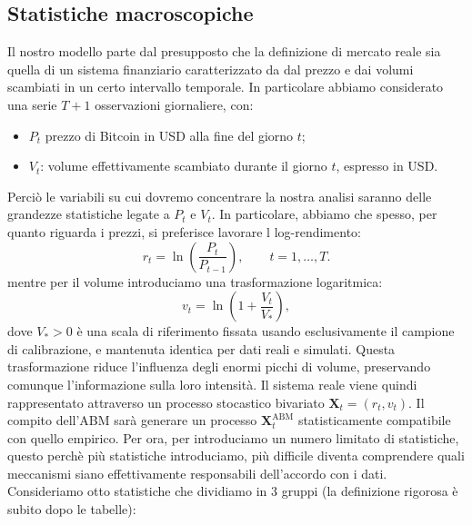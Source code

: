 \subsection{Statistiche macroscopiche}
Il nostro modello parte dal presupposto che la definizione di mercato reale sia quella di un sistema finanziario caratterizzato da dal prezzo e dai volumi 
scambiati in un certo intervallo temporale. In particolare abbiamo considerato una serie \(T+1\) osservazioni giornaliere, con:

\begin{itemize}
    \item $P_t$ prezzo di Bitcoin in USD alla fine del giorno \(t\);
    \item \(V_t\): volume effettivamente scambiato durante il giorno \(t\), espresso in USD.
\end{itemize}

Perciò le variabili su cui dovremo concentrare la nostra analisi saranno delle grandezze statistiche legate a \(P_t\) e \(V_t\). In particolare, abbiamo che
spesso, per quanto riguarda i prezzi, si preferisce lavorare l log-rendimento:
\[
r_t=\ln\left(\frac{P_t}{P_{t-1}}\right),\qquad t=1,\ldots,T.
\]
mentre per il volume introduciamo una trasformazione logaritmica:
\[
v_t=\ln\left(1+\frac{V_t}{V_*}\right),
\]
dove \(V_*>0\) è una scala di riferimento fissata usando esclusivamente il campione di calibrazione, e mantenuta identica per dati reali e simulati.
Questa trasformazione riduce l'influenza degli enormi picchi di volume, preservando comunque l'informazione sulla loro intensità.
Il sistema reale viene quindi rappresentato attraverso un processo stocastico bivariato $\mathbf X_t=(r_t,v_t)$.
Il compito dell'ABM sarà generare un processo \(\mathbf X_t^{\mathrm{ABM}}\) statisticamente compatibile con quello empirico. 
Per ora, per introduciamo un numero limitato di statistiche, questo perchè più statistiche introduciamo, più difficile diventa comprendere quali 
meccanismi siano effettivamente responsabili dell'accordo con i dati. Consideriamo otto statistiche che dividiamo in 3 gruppi (la definizione rigorosa
è subito dopo le tabelle):

